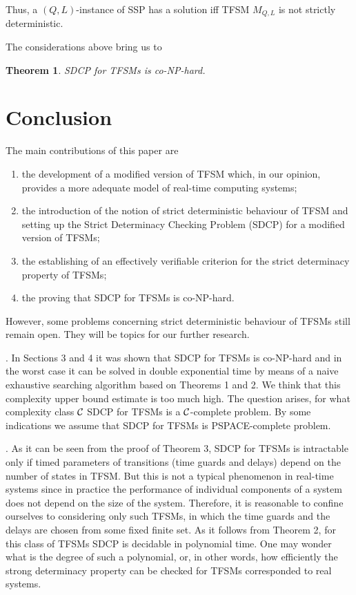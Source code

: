 \documentclass[conference]{IEEEtran}
\newtheorem{theorem}{Theorem}
\begin{document}
Thus, a $(Q,L)$-instance of SSP has a solution iff TFSM $M_{Q,L}$ is not strictly deterministic.

The considerations above bring us to

\begin{theorem}
{\itshape
SDCP for TFSMs is co-NP-hard.
}
\end{theorem}

\section{Conclusion}
The main contributions of this paper are
\begin{enumerate}
	\item the development of a modified version of TFSM which, in our opinion, provides a more adequate model of real-time computing systems;
	\item the introduction of the notion of strict deterministic behaviour of TFSM and setting up the Strict Determinacy Checking Problem (SDCP) for a modified version of TFSMs;
	\item the establishing of an effectively verifiable criterion for the strict determinacy property of TFSMs;
		\item the proving that SDCP for TFSMs is co-NP-hard.
\end{enumerate}
However, some problems concerning strict deterministic behaviour of TFSMs still remain open. They will be topics for our further research.
\smallskip

. In Sections 3 and 4 it was shown that SDCP for TFSMs is co-NP-hard and in the worst case it can be solved in double exponential time by means of a naive exhaustive searching algorithm based on Theorems 1 and 2. We think that this complexity upper bound estimate is too much high. The question arises, for what complexity class ${\cal C}$ SDCP for TFSMs is a ${\cal C}$-complete problem. By some indications we assume that SDCP for TFSMs is PSPACE-complete problem.
\smallskip

. As it can be seen from the proof of Theorem 3, SDCP for TFSMs is intractable only if timed parameters of transitions (time guards and delays) depend on the number of states in TFSM. But this is not a typical phenomenon in real-time systems since in practice the performance of individual components of a system does not depend on the size of the system. Therefore, it is reasonable to confine ourselves to considering only such TFSMs, in which the time guards and the delays are chosen from some fixed finite set. As it follows from Theorem 2, for this class of TFSMs SDCP is decidable in polynomial time. One may wonder what is the degree of such a polynomial, or, in other words, how efficiently the strong determinacy property can be checked for TFSMs corresponded to real systems.
\smallskip
\end{document}

